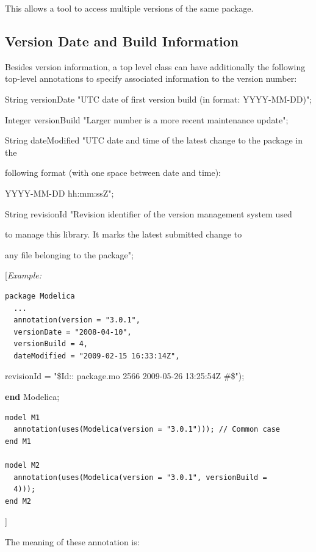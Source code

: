 \documentclass[10pt,a4paper]{report}
\def\doublelabel#1{\label{#1}\hypertarget{#1}{}}
\begin{document}
This allows a tool to access multiple versions of the same package.

\subsection{Version Date and Build Information}\doublelabel{version-date-and-build-information}

Besides version information, a top level class can have additionally the
following top-level annotations to specify associated information to the
version number:

String versionDate "UTC date of first version build (in format:
YYYY-MM-DD)";

Integer versionBuild "Larger number is a more recent maintenance
update";

String dateModified "UTC date and time of the latest change to the
package in the

following format (with one space between date and time):

YYYY-MM-DD hh:mm:ssZ";

String revisionId "Revision identifier of the version management system
used

to manage this library. It marks the latest submitted change to

any file belonging to the package";

{[}\emph{Example:}

\begin{lstlisting}[language=modelica]
package Modelica
  ...
  annotation(version = "3.0.1",
  versionDate = "2008-04-10",
  versionBuild = 4,
  dateModified = "2009-02-15 16:33:14Z",
\end{lstlisting}
revisionId = "\$Id:: package.mo 2566 2009-05-26 13:25:54Z \#\$");

\textbf{end} Modelica;

\begin{lstlisting}[language=modelica]
model M1
  annotation(uses(Modelica(version = "3.0.1"))); // Common case
end M1

model M2
  annotation(uses(Modelica(version = "3.0.1", versionBuild =
  4)));
end M2
\end{lstlisting}
{]}

The meaning of these annotation is:
\end{document}
